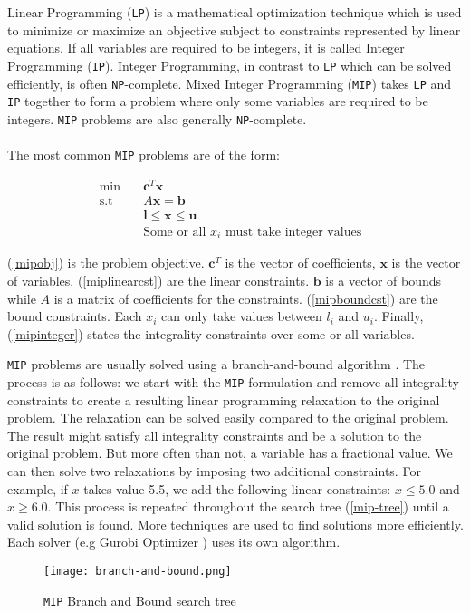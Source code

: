 \documentclass[../../thesis.tex]{subfiles}
\begin{document}
Linear Programming (\texttt{LP}) is a mathematical optimization technique which is used to minimize or maximize 
an objective subject to constraints represented by linear equations. 
If all variables are required to be integers, it is called Integer Programming (\texttt{IP}). 
Integer Programming, in contrast to \texttt{LP} which can be solved efficiently, is often \texttt{NP}-complete.  
Mixed Integer Programming (\texttt{MIP}) takes \texttt{LP} and \texttt{IP} together to form a problem where only some variables 
are required to be integers. \texttt{MIP} problems are also generally \texttt{NP}-complete.

\paragraph{}

The most common \texttt{MIP} problems are of the form:

\begin{align}
  \textrm{min} \quad & \bm{c}^T\bm{x} & \label{mipobj} \\ 
  \textrm{s.t} \quad & A\bm{x} = \bm{b} & \label{miplinearcst} \\
   & \bm{l} \leq \bm{x} \leq \bm{u} & \label{mipboundcst} \\
   & \text{Some or all $x_i$ must take integer values} \label{mipinteger}
\end{align}

(\ref{mipobj}) is the problem objective. $\bm{c}^T$ is the vector of coefficients, $\bm{x}$ is the vector of variables.
(\ref{miplinearcst}) are the linear constraints. $\bm{b}$ is a vector of bounds while $A$ is a matrix of coefficients for the constraints.
(\ref{mipboundcst}) are the bound constraints. Each $x_i$ can only take values between $l_i$ and $u_i$.
Finally, (\ref{mipinteger}) states the integrality constraints over some or all variables.


\texttt{MIP} problems are usually solved using a branch-and-bound algorithm \cite{mip-basics}.
The process is as follows: we start with the \texttt{MIP} formulation and remove all integrality constraints 
to create a resulting linear programming relaxation to the original problem. The relaxation can be solved 
easily compared to the original problem. The result might satisfy all integrality constraints and be a solution to the original problem.
But more often than not, a variable has a fractional value.
We can then solve two relaxations by imposing two additional constraints. For example, if $x$ takes value 5.5, we add the 
following linear constraints: $x \leq 5.0$ and $x \geq 6.0$. 
This process is repeated throughout the search tree (\autoref{mip-tree}) until a valid solution is found.
More techniques are used to find solutions more efficiently. Each solver (e.g Gurobi Optimizer \cite{mip-basics}) uses its
own algorithm.

\begin{figure}
  \centering
  \texttt{[image: branch-and-bound.png]}
  \caption{\texttt{MIP} Branch and Bound search tree \cite{mip-basics}}
  \label{mip-tree}
\end{figure}
\end{document}
